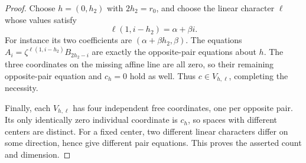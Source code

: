 \begin{proof}
Choose \(h=(0,h_2)\) with \(2h_2=r_0\), and choose the
linear character \(\ell\) whose values satisfy
\[
 \ell(1,i-h_2)=\alpha+\beta i.
\]
For instance its two coefficients are
\((\alpha+\beta h_2,\beta)\).  The equations
\(A_i=\zeta^{\ell(1,i-h_2)}B_{2h_2-i}\) are exactly the
opposite-pair equations about \(h\).  The three coordinates
on the missing affine line are all zero, so their remaining
opposite-pair equation and \(c_h=0\) hold as well.
Thus \(c\in V_{h,\ell}\), completing the necessity.

Finally, each \(V_{h,\ell}\) has four independent free
coordinates, one per opposite pair.  Its only identically zero
individual coordinate is \(c_h\), so spaces with different
centers are distinct.  For a fixed center, two different linear
characters differ on some direction, hence give different
pair equations.  This proves the asserted count and dimension.
\end{proof}

